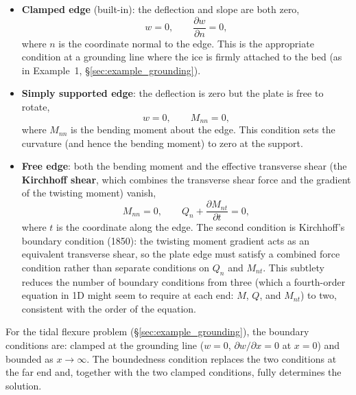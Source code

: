 \documentclass[11pt]{article}
\begin{document}
\begin{itemize}
  \item \textbf{Clamped edge} (built-in): the deflection and slope are both zero,
  \begin{equation}
    w = 0, \qquad \frac{\partial w}{\partial n} = 0,
  \end{equation}
  where $n$ is the coordinate normal to the edge.  This is the appropriate condition at a grounding line where the ice is firmly attached to the bed (as in Example~1, \S\ref{sec:example_grounding}).

  \item \textbf{Simply supported edge}: the deflection is zero but the plate is free to rotate,
  \begin{equation}
    w = 0, \qquad M_{nn} = 0,
  \end{equation}
  where $M_{nn}$ is the bending moment about the edge.  This condition sets the curvature (and hence the bending moment) to zero at the support.

  \item \textbf{Free edge}: both the bending moment and the effective transverse shear (the \textbf{Kirchhoff shear}, which combines the transverse shear force and the gradient of the twisting moment) vanish,
  \begin{equation}
    M_{nn} = 0, \qquad Q_n + \frac{\partial M_{nt}}{\partial t} = 0,
  \end{equation}
  where $t$ is the coordinate along the edge.  The second condition is Kirchhoff's boundary condition (1850): the twisting moment gradient acts as an equivalent transverse shear, so the plate edge must satisfy a combined force condition rather than separate conditions on $Q_n$ and $M_{nt}$.  This subtlety reduces the number of boundary conditions from three (which a fourth-order equation in 1D might seem to require at each end: $M$, $Q$, and $M_{nt}$) to two, consistent with the order of the equation.
\end{itemize}

\noindent For the tidal flexure problem (\S\ref{sec:example_grounding}), the boundary conditions are: clamped at the grounding line ($w = 0$, $\partial w/\partial x = 0$ at $x = 0$) and bounded as $x \to \infty$.  The boundedness condition replaces the two conditions at the far end and, together with the two clamped conditions, fully determines the solution.

\clearpage
\end{document}
